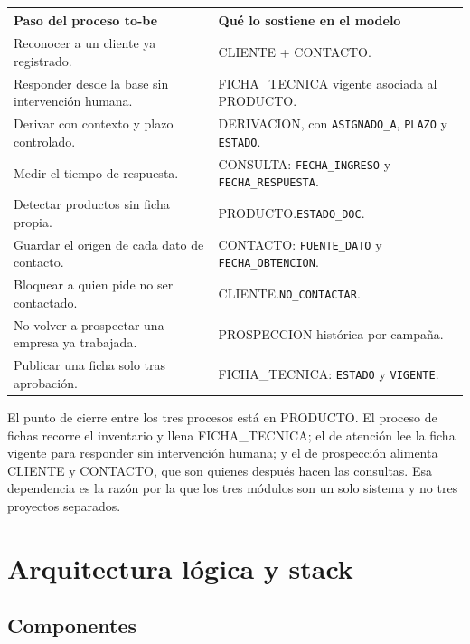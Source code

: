 \documentclass{article}
\begin{document}
\begin{table}[H]
\centering
\small
\begin{tabularx}{\textwidth}{LL}
\toprule
\textbf{Paso del proceso to-be} & \textbf{Qué lo sostiene en el modelo} \\
\midrule
Reconocer a un cliente ya registrado. & CLIENTE + CONTACTO. \\
Responder desde la base sin intervención humana. & FICHA\_TECNICA vigente asociada al PRODUCTO. \\
Derivar con contexto y plazo controlado. & DERIVACION, con \texttt{ASIGNADO\_A}, \texttt{PLAZO} y \texttt{ESTADO}. \\
Medir el tiempo de respuesta. & CONSULTA: \texttt{FECHA\_INGRESO} y \texttt{FECHA\_RESPUESTA}. \\
Detectar productos sin ficha propia. & PRODUCTO.\texttt{ESTADO\_DOC}. \\
Guardar el origen de cada dato de contacto. & CONTACTO: \texttt{FUENTE\_DATO} y \texttt{FECHA\_OBTENCION}. \\
Bloquear a quien pide no ser contactado. & CLIENTE.\texttt{NO\_CONTACTAR}. \\
No volver a prospectar una empresa ya trabajada. & PROSPECCION histórica por campaña. \\
Publicar una ficha solo tras aprobación. & FICHA\_TECNICA: \texttt{ESTADO} y \texttt{VIGENTE}. \\
\bottomrule
\end{tabularx}
\end{table}

El punto de cierre entre los tres procesos está en PRODUCTO. El proceso de fichas recorre el inventario y llena FICHA\_TECNICA; el de atención lee la ficha vigente para responder sin intervención humana; y el de prospección alimenta CLIENTE y CONTACTO, que son quienes después hacen las consultas. Esa dependencia es la razón por la que los tres módulos son un solo sistema y no tres proyectos separados.

\section{Arquitectura lógica y stack}

\subsection{Componentes}
\end{document}
